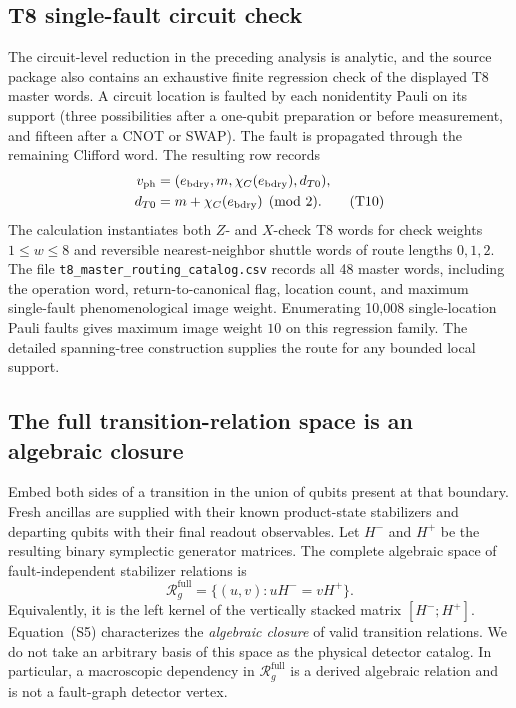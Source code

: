 \documentclass[aps,prx,reprint,superscriptaddress,nofootinbib,floatfix,longbibliography]{revtex4-2}
\theoremstyle{definition}
\begin{document}
\subsection{T8 single-fault circuit check}
The circuit-level reduction in the preceding analysis is analytic, and the source package also contains an exhaustive finite regression check of the displayed T8 master words.  A circuit location is faulted by each nonidentity Pauli on its support (three possibilities after a one-qubit preparation or before measurement, and fifteen after a CNOT or SWAP).  The fault is propagated through the remaining Clifford word.  The resulting row records
\begin{align}
 v_{\rm ph}&=(e_{\rm bdry},m,\chi_C(e_{\rm bdry}),d_{T0}), \notag\\
 d_{T0}&=m+\chi_C(e_{\rm bdry})\pmod 2 . \tag{T10}
\end{align}
The calculation instantiates both $Z$- and $X$-check T8 words for check weights $1\le w\le8$ and reversible nearest-neighbor shuttle words of route lengths $0,1,2$.  The file \texttt{t8\_master\_routing\_catalog.csv} records all 48 master words, including the operation word, return-to-canonical flag, location count, and maximum single-fault phenomenological image weight.  Enumerating 10,008 single-location Pauli faults gives maximum image weight $10$ on this regression family.  The detailed spanning-tree construction supplies the route for any bounded local support.

\subsection{The full transition-relation space is an algebraic closure}
Embed both sides of a transition in the union of qubits present at that
boundary.  Fresh ancillas are supplied with their known product-state
stabilizers and departing qubits with their final readout observables.  Let
$H^-$ and $H^+$ be the resulting binary symplectic generator matrices.  The
complete algebraic space of fault-independent stabilizer relations is
\begin{equation}
 \mathcal R_g^{\mathrm{full}}
 =\{(u,v):uH^-=vH^+\}.
 \tag{S5}
\end{equation}
Equivalently, it is the left kernel of the vertically stacked matrix
$[H^-;H^+]$.  Equation~(S5) characterizes the \emph{algebraic closure} of
valid transition relations.  We do not take an arbitrary basis of this space
as the physical detector catalog.  In particular, a macroscopic dependency
in $\mathcal R_g^{\mathrm{full}}$ is a derived algebraic relation and is not a
fault-graph detector vertex.
\end{document}
